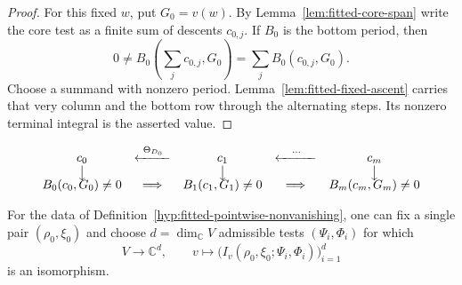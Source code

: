 \begin{proof}
For this fixed \(w\), put \(G_0=v(w)\). By Lemma~\ref{lem:fitted-core-span} write the core test as a finite sum of descents \(c_{0,j}\). If \(B_0\) is the bottom period, then
\[
  0\ne B_0(\textstyle\sum_j c_{0,j},G_0)=\sum_j B_0(c_{0,j},G_0).
\]
Choose a summand with nonzero period.
Lemma~\ref{lem:fitted-fixed-ascent} carries that very column and the
bottom row through the alternating steps. Its nonzero terminal
integral is the asserted value.
\end{proof}

\begin{construction}
\[
\begin{array}{ccccc}
 c_0 &\xleftarrow{\ \Theta_{D_0}\ }& c_1
     &\xleftarrow{\quad\cdots\quad}& c_m\\
 \big\downarrow&&\big\downarrow&&\big\downarrow\\[-2pt]
 B_0(c_0,G_0)\ne0 &\Longrightarrow&
      B_1(c_1,G_1)\ne0 &\Longrightarrow& B_m(c_m,G_m)\ne0
\end{array}
\]
\caption{The top row constructs a test for the original period from
a definite column. Along the bottom row each implication chooses
one permitted test for the next lift; the previously chosen column
and the bottom row vector stay fixed.}
\label{fig:fitted-period-chain}
\end{construction}

\begin{proposition}\label{prop:fitted-grid-base-separation}
For the data of Definition~\ref{hyp:fitted-pointwise-nonvanishing}, one can fix a single pair \((\rho_0,\xi_0)\) and choose \(d=\dim_{\mathbb C}V\) admissible tests \((\Psi_i,\Phi_i)\) for which
\[
   V\longrightarrow\mathbb C^d,\qquad
   v\longmapsto\bigl(I_v(\rho_0,\xi_0;\Psi_i,\Phi_i)\bigr)_{i=1}^d
\]
is an isomorphism.
\end{proposition}

